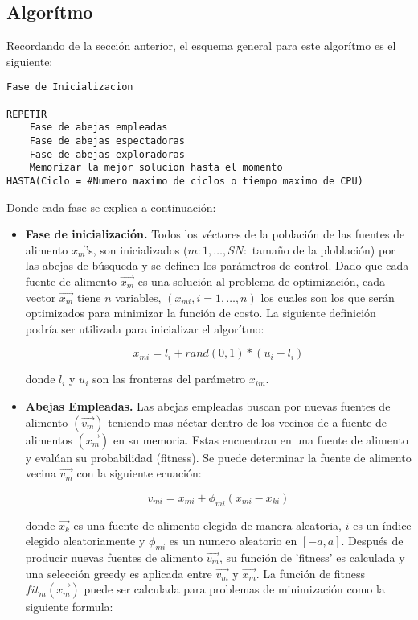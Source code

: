 \documentclass{article}
\begin{document}
\subsection{Algor\'itmo}
Recordando de la secci\'on anterior, el esquema general para este algor\'itmo es el siguiente:
  
\begin{lstlisting}
Fase de Inicializacion

REPETIR
    Fase de abejas empleadas
    Fase de abejas espectadoras
    Fase de abejas exploradoras
    Memorizar la mejor solucion hasta el momento
HASTA(Ciclo = #Numero maximo de ciclos o tiempo maximo de CPU)
\end{lstlisting} 
 
Donde cada fase se explica a continuaci\'on:

\begin{itemize}
    \item \textbf{Fase de inicializaci\'on.}
    Todos los v\'ectores de la poblaci\'on de las fuentes de alimento $\vec{x_m}$'s, son inicializados ($m:1,\dots ,SN:$ tamaño de la ploblaci\'on) por las abejas de búsqueda y se definen los parámetros de control. Dado que cada fuente de alimento $\vec{x_m}$ es una soluci\'on al problema de optimizaci\'on, cada vector $\vec{x_m}$ tiene $n$ variables, $(x_{mi}, i = 1,\dots,n)$ los cuales son los que serán optimizados para minimizar la funci\'on de costo. 
    \medskip
    La siguiente definici\'on podría ser utilizada para inicializar el algor\'itmo:
    
    $$x_{mi}=l_i+rand(0,1)*(u_i-l_i)$$
    
    donde $l_i$ y $u_i$ son las fronteras del parámetro $x_{im}$.
    
    \item \textbf{Abejas Empleadas.}
    Las abejas empleadas buscan por nuevas fuentes de alimento $(\vec{v_m})$ teniendo mas néctar dentro de los vecinos de a fuente de alimentos $(\vec{x_m})$ en su memoria. Estas encuentran en una fuente de alimento y evalúan su probabilidad (fitness). Se puede determinar la fuente de alimento vecina $\vec{v_m}$ con la siguiente ecuación:
    
    $$v_{mi}=x_{mi}+\phi_{mi}(x_{mi}-x_{ki})$$
    
    donde $\vec{x_k}$ es una fuente de alimento elegida de manera aleatoria, $i$ es un índice elegido aleatoriamente y $\phi_{mi}$ es un numero aleatorio en $[-a,a]$. Después de producir nuevas fuentes de alimento $\vec{v_m}$, su función de 'fitness' es calculada y una selección greedy es aplicada entre $\vec{v_m}$ y $\vec{x_m}$. La función de fitness $fit_m(\vec{x_m})$ puede ser calculada para problemas de minimización como la siguiente formula:
    

\end{itemize}
\end{document}
